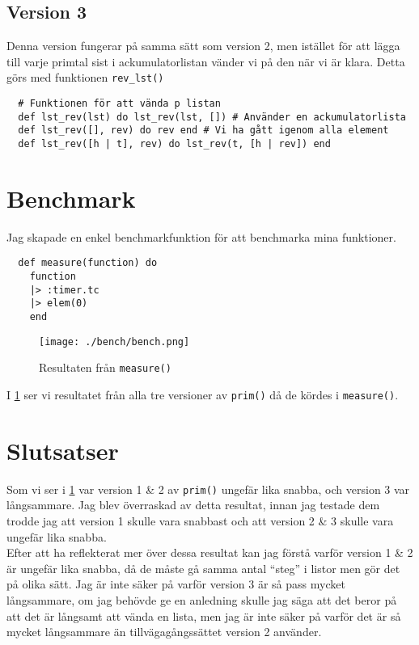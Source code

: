 \documentclass[a4paper,11pt]{article}
\begin{document}
\subsection*{Version 3}
Denna version fungerar på samma sätt som version 2, men istället för att lägga till varje primtal sist i ackumulatorlistan vänder vi på den när vi är klara.
Detta görs med funktionen {\tt rev\_lst()}
\begin{verbatim}
  # Funktionen för att vända p listan
  def lst_rev(lst) do lst_rev(lst, []) # Använder en ackumulatorlista
  def lst_rev([], rev) do rev end # Vi ha gått igenom alla element
  def lst_rev([h | t], rev) do lst_rev(t, [h | rev]) end
\end{verbatim}

\section*{Benchmark}
Jag skapade en enkel benchmarkfunktion för att benchmarka mina funktioner.

\begin{verbatim}
  def measure(function) do
    function
    |> :timer.tc
    |> elem(0)
    end
  \end{verbatim}
  
\begin{figure}
  \texttt{[image: ./bench/bench.png]}
  \caption{Resultaten från {\tt measure()}}
  \label{fig:bench_all}
\end{figure}

  I \ref{fig:bench_all} ser vi resultatet från alla tre versioner av {\tt prim()} då de kördes i {\tt measure()}.

  \pagebreak
\section*{Slutsatser}
Som vi ser i \ref{fig:bench_all} var version 1 \& 2 av {\tt prim()} ungefär lika snabba, och version 3 var långsammare. Jag blev överraskad av detta resultat, innan jag testade dem trodde jag att version 1 skulle vara snabbast och att version 2 \& 3 skulle vara ungefär lika snabba. \\
Efter att ha reflekterat mer över dessa resultat kan jag förstå varför version 1 \& 2 är ungefär lika snabba, då de måste gå samma antal ``steg'' i listor men gör det på olika sätt. Jag är inte säker på varför version 3 är så pass mycket långsammare, om jag behövde ge en anledning skulle jag säga att det beror på att det är långsamt att vända en lista, men jag är inte säker på varför det är så mycket långsammare än tillvägagångssättet version 2 använder.
\end{document}
